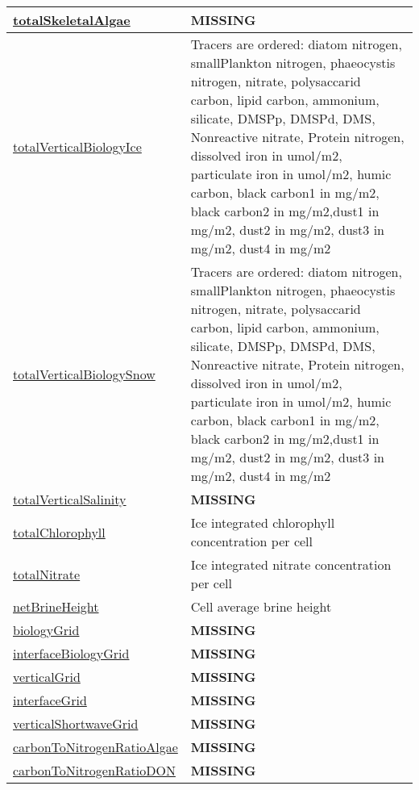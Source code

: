 {\begin{center}
\begin{longtable}{| p{2.0in} | p{4.0in} |}
    \hyperref[subsec:var_sec_biogeochemistry_totalSkeletalAlgae]{totalSkeletalAlgae} & {\bf \color{red} MISSING} \\
    \hline
    \hyperref[subsec:var_sec_biogeochemistry_totalVerticalBiologyIce]{totalVerticalBiologyIce} & Tracers are ordered: diatom nitrogen, smallPlankton nitrogen, phaeocystis nitrogen, nitrate, polysaccarid carbon,    lipid carbon, ammonium, silicate, DMSPp, DMSPd, DMS, Nonreactive nitrate, Protein nitrogen, dissolved iron in umol/m2, particulate    iron in umol/m2, humic carbon, black carbon1 in mg/m2, black carbon2 in mg/m2,dust1 in mg/m2, dust2 in mg/m2, dust3 in mg/m2,    dust4 in mg/m2 \\
    \hline
    \hyperref[subsec:var_sec_biogeochemistry_totalVerticalBiologySnow]{totalVerticalBiologySnow} & Tracers are ordered: diatom nitrogen, smallPlankton nitrogen, phaeocystis nitrogen, nitrate, polysaccarid carbon,    lipid carbon, ammonium, silicate, DMSPp, DMSPd, DMS, Nonreactive nitrate, Protein nitrogen, dissolved iron in umol/m2, particulate    iron in umol/m2, humic carbon, black carbon1 in mg/m2, black carbon2 in mg/m2,dust1 in mg/m2, dust2 in mg/m2, dust3 in mg/m2,    dust4 in mg/m2 \\
    \hline
    \hyperref[subsec:var_sec_biogeochemistry_totalVerticalSalinity]{totalVerticalSalinity} & {\bf \color{red} MISSING} \\
    \hline
    \hyperref[subsec:var_sec_biogeochemistry_totalChlorophyll]{totalChlorophyll} & Ice integrated chlorophyll concentration per cell \\
    \hline
    \hyperref[subsec:var_sec_biogeochemistry_totalNitrate]{totalNitrate} & Ice integrated nitrate concentration per cell \\
    \hline
    \hyperref[subsec:var_sec_biogeochemistry_netBrineHeight]{netBrineHeight} & Cell average brine height \\
    \hline
    \hyperref[subsec:var_sec_biogeochemistry_biologyGrid]{biologyGrid} & {\bf \color{red} MISSING} \\
    \hline
    \hyperref[subsec:var_sec_biogeochemistry_interfaceBiologyGrid]{interfaceBiologyGrid} & {\bf \color{red} MISSING} \\
    \hline
    \hyperref[subsec:var_sec_biogeochemistry_verticalGrid]{verticalGrid} & {\bf \color{red} MISSING} \\
    \hline
    \hyperref[subsec:var_sec_biogeochemistry_interfaceGrid]{interfaceGrid} & {\bf \color{red} MISSING} \\
    \hline
    \hyperref[subsec:var_sec_biogeochemistry_verticalShortwaveGrid]{verticalShortwaveGrid} & {\bf \color{red} MISSING} \\
    \hline
    \hyperref[subsec:var_sec_biogeochemistry_carbonToNitrogenRatioAlgae]{carbonToNitrogenRatioAlgae} & {\bf \color{red} MISSING} \\
    \hline
    \hyperref[subsec:var_sec_biogeochemistry_carbonToNitrogenRatioDON]{carbonToNitrogenRatioDON} & {\bf \color{red} MISSING} \\
    \hline
\end{longtable}
\end{center}
}
